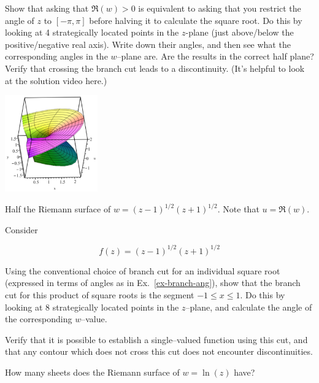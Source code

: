 \begin{exer}
\label{ex-branch-ang}
Show that asking that $\Re(w)>0$ is equivalent to asking that you restrict the angle of $z$ to $[-\pi, \pi]$ before halving it to calculate the square root. Do this by looking at 4 strategically located points in the $z$-plane (just above/below the positive/negative real axis). Write down their angles, and then see what the corresponding angles in the $w$--plane are. Are the results in the correct half plane? Verify that crossing the branch cut leads to a discontinuity. (It's helpful to look at the solution video here.)
\end{exer}

\begin{exer}
\label{ex-product-roots}
\begin{marginfigure}[0.5cm]
\centering
\includegraphics[width=4cm]{complex/figures/riemann2}
\caption{Half the Riemann surface of $w=(z-1)^{1/2}(z+1)^{1/2}$. Note that $u=\Re(w)$. }
\label{fig-riemann2}
\end{marginfigure}
Consider

$$f(z)=(z-1)^{1/2}(z+1)^{1/2}$$

Using the conventional choice of branch cut for an individual square root (expressed in terms of angles as in Ex.~\ref{ex-branch-ang}), show that the branch cut for this product of square roots is the segment $-1 \le x \le 1$. Do this by looking at 8 strategically located points in the $z$--plane, and calculate the angle of the corresponding $w$--value.


Verify that it is possible to establish a single--valued function using this cut, and that any contour which does not cross this cut does not encounter discontinuities.
\end{exer}

\begin{exer}
How many sheets does the Riemann surface of $w=\ln(z)$ have?
\end{exer}

